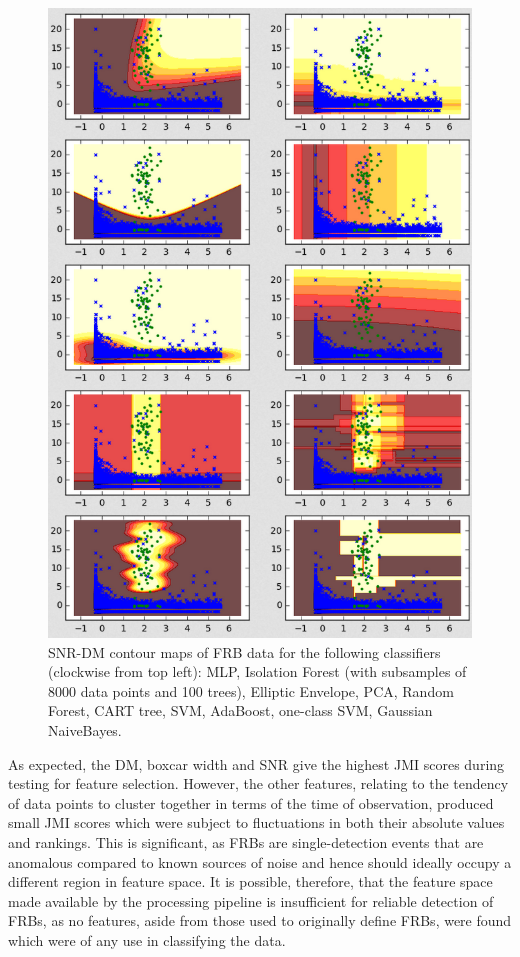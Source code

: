 \documentclass[12pt]{article}
\begin{document}
\begin{figure}[h!]
\begin{center}
\includegraphics[scale=0.5]{classifier_contours.png}
\caption{SNR-DM contour maps of FRB data for the following classifiers (clockwise from top left): MLP, Isolation Forest (with subsamples of 8000 data points and 100 trees), Elliptic Envelope, PCA, Random Forest, CART tree, SVM, AdaBoost, one-class SVM, Gaussian NaiveBayes. }
\label{frbContour}
\end{center}
\end{figure}

As expected, the DM, boxcar width and SNR give the highest JMI scores during testing for feature selection. However, the other features, relating to the tendency of data points to cluster together in terms of the time of observation, produced small JMI scores which were subject to fluctuations in both their absolute values and rankings. This is significant, as FRBs are single-detection events that are anomalous compared to known sources of noise and hence should ideally occupy a different region in feature space. It is possible, therefore, that the feature space made available by the processing pipeline is insufficient for reliable detection of FRBs, as no features, aside from those used to originally define FRBs, were found which were of any use in classifying the data.
\end{document}
